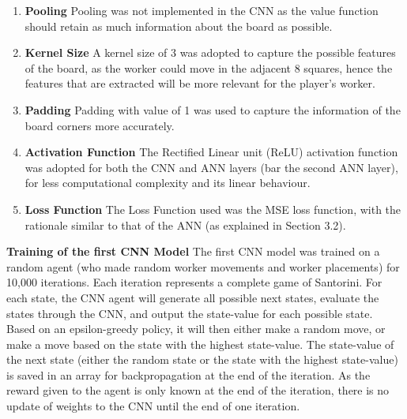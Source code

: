 \documentclass[a4paper,12pt,table]{article}
\begin{document}
\begin{enumerate}
    \item \textbf{Pooling}
    \newline
    Pooling was not implemented in the CNN as the value function should retain as much information about the board as possible. 
    
    \item \textbf{Kernel Size}
    \newline
    A kernel size of 3 was adopted to capture the possible features of the board, as the worker could move in the adjacent 8 squares, hence the features that are extracted will be more relevant for the player’s worker.
    
    \item \textbf{Padding}
    \newline
    Padding with value of 1 was used to capture the information of the board corners more accurately.
    
    \item \textbf{Activation Function}
    \newline
    The Rectified Linear unit (ReLU) activation function was adopted for both the CNN and ANN layers (bar the second ANN layer), for less computational complexity and its linear behaviour.

    \item \textbf{Loss Function}
    \newline
    The Loss Function used was the MSE loss function, with the rationale similar to that of the ANN (as explained in Section 3.2).
\end{enumerate}

\textbf{Training of the first CNN Model}
\newline
The first CNN model was trained on a random agent (who made random worker movements and worker placements) for 10,000 iterations. Each iteration represents a complete game of Santorini. For each state, the CNN agent will generate all possible next states, evaluate the states through the CNN, and output the state-value for each possible state. Based on an epsilon-greedy policy, it will then either make a random move, or make a move based on the state with the highest state-value. The state-value of the next state (either the random state or the state with the highest state-value) is saved in an array for backpropagation at the end of the iteration. As the reward given to the agent is only known at the end of the iteration, there is no update of weights to the CNN until the end of one iteration. \par
\end{document}
